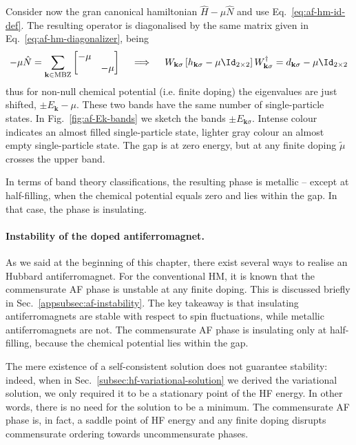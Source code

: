 Consider now the gran canonical hamiltonian $\hat H - \mu\hat N$ and use Eq.~\eqref{eq:af-hm-id-def}. The resulting operator is diagonalised by the same matrix given in Eq.~\eqref{eq:af-hm-diagonalizer}, being
\begin{equation}\label{eq:af-WkW+-hm}
	-\mu\hat N = \sum_{\mathbf{k}\in\mathrm{MBZ}} \begin{bmatrix}
		-\mu & \\ & -\mu
	\end{bmatrix}
	\quad\implies\quad
	W_{\mathbf{k}\sigma} \left[ 
	h_{\mathbf{k}\sigma}-\mu \Id_{2\times2}
	\right] W_{\mathbf{k}\sigma}^\dagger = d_{\mathbf{k}\sigma}-\mu \Id_{2\times2}
\end{equation}
thus for non-null chemical potential (i.e. finite doping) the eigenvalues are just shifted, $\pm E_\mathbf{k}-\mu$. These two bands have the same number of single-particle states. In Fig.~\ref{fig:af-Ek-bands} we sketch the bands $\pm E_{\mathbf{k}\sigma}$. Intense colour indicates an almost filled single-particle state, lighter gray colour an almost empty single-particle state. The gap is at zero energy, but at any finite doping $\tilde{\mu}$ crosses the upper band. 

In terms of band theory classifications, the resulting phase is metallic -- except at half-filling, when the chemical potential equals zero and lies within the gap. In that case, the phase is insulating.

\paragraph{Instability of the doped antiferromagnet.}

As we said at the beginning of this chapter, there exist several ways to realise an Hubbard antiferromagnet. For the conventional HM, it is known \cite{singh1990collective,singh1991doped} that the commensurate AF phase is unstable at any finite doping. This is discussed briefly in Sec.~\ref{appsubsec:af-instability}. The key takeaway is that insulating antiferromagnets are stable with respect to spin fluctuations, while metallic antiferromagnets are not. The commensurate AF phase is insulating only at half-filling, because the chemical potential lies within the gap.

The mere existence of a self-consistent solution does not guarantee stability: indeed, when in Sec.~\ref{subsec:hf-variational-solution} we derived the variational solution, we only required it to be a stationary point of the HF energy. In other words, there is no need for the solution to be a minimum. The commensurate AF phase is, in fact, a saddle point of HF energy \cite{singh1990collective} and any finite doping disrupts commensurate ordering towards uncommensurate phases.

